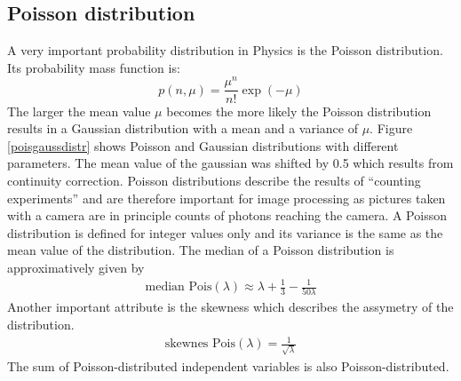 \subsection{Poisson distribution}
A very important probability distribution in Physics is the Poisson
distribution. Its probability mass function is:
\begin{equation}
	p(n,\mu) = \frac{\mu^n}{n!}\exp(-\mu)
\end{equation}
The larger the mean value $\mu$ becomes the more likely the Poisson distribution results in a Gaussian distribution with a mean and a variance of $\mu$. Figure \ref{poisgaussdistr} shows Poisson and Gaussian distributions with different parameters. The mean value of the gaussian was shifted by 0.5 which results from continuity correction.\newline
Poisson distributions describe the results of ``counting experiments'' and are
therefore important for image processing as pictures taken with a
camera are in principle counts of photons reaching the camera.  \newline
A Poisson distribution is defined for integer values only and its variance is
the same as the mean value of the distribution.\newline
The median of a Poisson distribution is approximatively given by
\begin{align}
	\text{median Pois}(\lambda) \approx \lambda + \frac{1}{3} - \frac{1}{50\lambda} \label{meanMedianPoiss}
\end{align}
Another important attribute is
the skewness which describes the assymetry of the distribution.
\begin{align}
 \text{skewnes Pois}(\lambda) = \frac{1}{\sqrt{\lambda}}
\end{align}
The sum of Poisson-distributed independent variables is also Poisson-distributed.
